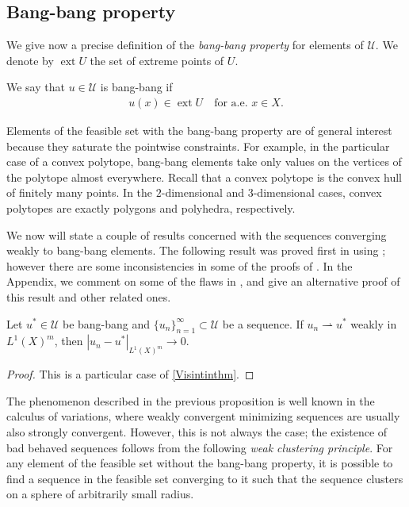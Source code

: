 \documentclass[hidelinks,onefignum,onetabnum]{siamart220329}
\newcommand{\ext}{\operatorname{ext}}
\begin{document}
	\subsection{Bang-bang property}	
	
We give now a precise definition of the \emph{bang-bang property} for elements of $\mathcal U$. We denote by $\ext U$ the set of extreme points of $U$.

\begin{definition}
	We say that $u\in\mathcal U$ is bang-bang if 
	\begin{align*}
		u(x)\in \ext U\quad\text{for a.e. $x\in X$.} 
	\end{align*}
\end{definition}

Elements of the feasible set with the bang-bang property are of general interest because they saturate the pointwise constraints. For example, in the particular case of a convex polytope, bang-bang elements take only values on the vertices of the polytope almost everywhere. Recall that a convex polytope is the convex hull of finitely many points. In the $2$-dimensional and $3$-dimensional  cases, convex polytopes  are exactly polygons and polyhedra, respectively.


We now will state a couple of results concerned with the sequences converging weakly to bang-bang elements. The following result was proved first in \cite[Corollary 2]{Visin} using \cite[Theorem 1]{Visin}; however there are some inconsistencies in some of the proofs of \cite{Visin}. In the Appendix, we comment on some of the flaws in  \cite{Visin}, and  give an alternative proof of this result and other related ones.


\begin{proposition}
	Let $u^*\in\mathcal U$ be bang-bang and $\{u_n\}_{n=1}^\infty\subset\mathcal U$ be a sequence. If  $u_n\rightharpoonup u^*$ weakly in ${L^1(X)^m}$, then $|u_n-u^*|_{{L^1(X)^m}}\to0$.
\end{proposition}
\begin{proof}
	This is a particular case of \cref{Visintinthm}.
\end{proof}

The phenomenon described in the previous proposition is well known in the calculus of variations, where weakly convergent minimizing sequences are usually also strongly convergent.  However, this is not always the case; the existence of bad behaved sequences follows from the following \textit{weak clustering principle}. For any element of the feasible set without the bang-bang property, it is  possible to find a sequence in the feasible set converging to it such that the sequence clusters on a sphere of arbitrarily small radius.
\end{document}
